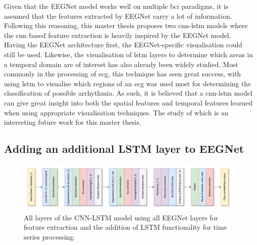 Given that the EEGNet model works well on multiple \gls{bci} paradigms, it is assumed that the features extracted by EEGNet carry a lot of information.
Following this reasoning, this master thesis proposes two \gls{cnn}-\gls{lstm} models where the \gls{cnn} based feature extraction is heavily inspired by the EEGNet model.
Having the EEGNet architecture first, the EEGNet-specific visualisation could still be used.
Likewise, the visualisation of \gls{lstm} layers to determine which areas in a temporal domain are of interest has also already been widely studied.
Most commonly in the processing of \gls{ecg}, this technique has seen great success, with \citet{lstm_visual_ecg} using \gls{lstm} to visualise which regions of an \gls{ecg} was used most for determining the classification of possible arrhythmia.
As such, it is believed that a \gls{cnn}-\gls{lstm} model can give great insight into both the spatial features and temporal features learned when using appropriate visualisation techniques.
The study of which is an interesting future work for this master thesis.


\subsection{Adding an additional LSTM layer to EEGNet}
\label{subsec:offline_bci_system_adding_memory_lstm_eegnet}


\begin{figure}[t]
    \centering
    \includegraphics[width=\linewidth]{../images/pipeline/eegnetlstm_full.pdf}
    \captionsetup{width=0.8\linewidth}
    \captionsetup{justification=centering}
    \caption{All layers of the CNN-LSTM model using all EEGNet layers for feature extraction and the addition of LSTM functionality for time series processing.}
    \label{fig:eegnetlstm_full}
\end{figure}

